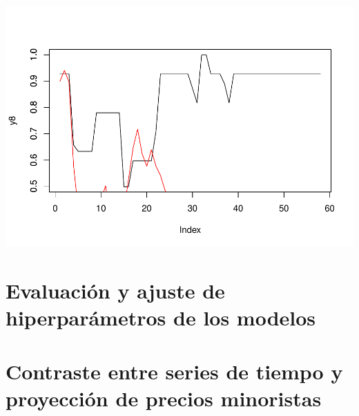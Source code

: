 \documentclass[
]{book}
\begin{document}
\includegraphics{bookdown-demo_files/figure-latex/unnamed-chunk-203-1.pdf}

\hypertarget{evaluaciuxf3n-y-ajuste-de-hiperparuxe1metros-de-los-modelos}{%
\chapter{Evaluación y ajuste de hiperparámetros de los modelos}\label{evaluaciuxf3n-y-ajuste-de-hiperparuxe1metros-de-los-modelos}}

\hypertarget{contraste-entre-series-de-tiempo-y-proyecciuxf3n-de-precios-minoristas}{%
\chapter{Contraste entre series de tiempo y proyección de precios minoristas}\label{contraste-entre-series-de-tiempo-y-proyecciuxf3n-de-precios-minoristas}}

  
\end{document}
